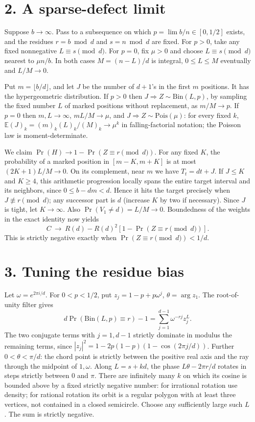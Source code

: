 \documentclass[11pt]{article}
\begin{document}
\section*{2. A sparse-defect limit}\label{a-sparse-defect-limit}

Suppose \(b\to\infty\). Pass to a subsequence on which
\(p=\lim b/n\in[0,1/2]\) exists, and the residues \(r=b\bmod d\) and
\(s=n\bmod d\) are fixed. For \(p>0\), take any fixed nonnegative
\(L\equiv s\pmod d\). For \(p=0\), fix \(\mu>0\) and choose
\(L\equiv s\pmod d\) nearest to \(\mu n/b\). In both cases \(M=(n-L)/d\)
is integral, \(0\le L\le M\) eventually and \(L/M\to0\).

Put \(m=\lfloor b/d\rfloor\), and let \(J\) be the number of \(d+1\)'s
in the first \(m\) positions. It has the hypergeometric distribution. If
\(p>0\) then \(J\Rightarrow Z\sim\mathrm{Bin}(L,p)\), by sampling the
fixed number \(L\) of marked positions without replacement, as
\(m/M\to p\). If \(p=0\) then \(m,L\to\infty\), \(mL/M\to\mu\), and
\(J\Rightarrow Z\sim\mathrm{Pois}(\mu)\): for every fixed \(k\),
\(\mathbb E(J)_k=(m)_k(L)_k/(M)_k\to\mu^k\) in falling-factorial
notation; the Poisson law is moment-determinate.

We claim \(\Pr(H)\to1-\Pr(Z\equiv r\pmod d)\). For any fixed \(K\), the
probability of a marked position in \([m-K,m+K]\) is at most
\((2K+1)L/M\to0\). On its complement, near \(m\) we have \(T_t=dt+J\).
If \(J\le K\) and \(K\ge4\), this arithmetic progression locally spans
the entire target interval and its neighbors, since \(0\le b-dm<d\).
Hence it hits the target precisely when \(J\not\equiv r\pmod d\); any
successor part is \(d\) (increase \(K\) by two if necessary). Since
\(J\) is tight, let \(K\to\infty\). Also \(\Pr(V_1\ne d)=L/M\to0\).
Boundedness of the weights in the exact identity now yields \[
 C\ \longrightarrow\ R(d)-R(d)^2[1-\Pr(Z\equiv r\pmod d)].
\] This is strictly negative exactly when \(\Pr(Z\equiv r\pmod d)<1/d\).

\section*{3. Tuning the residue bias}\label{tuning-the-residue-bias}

Let \(\omega=e^{2\pi i/d}\). For \(0<p<1/2\), put \(z_j=1-p+p\omega^j\),
\(\theta=\arg z_1\). The root-of-unity filter gives \[
 d\Pr(\mathrm{Bin}(L,p)\equiv r)-1
 =\sum_{j=1}^{d-1}\omega^{-rj}z_j^L.
\] The two conjugate terms with \(j=1,d-1\) strictly dominate in modulus
the remaining terms, since \(|z_j|^2=1-2p(1-p)(1-\cos(2\pi j/d))\).
Further \(0<\theta<\pi/d\): the chord point is strictly between the
positive real axis and the ray through the midpoint of \(1,\omega\).
Along \(L=s+kd\), the phase \(L\theta-2\pi r/d\) rotates in steps
strictly between 0 and \(\pi\). There are infinitely many \(k\) on which
its cosine is bounded above by a fixed strictly negative number: for
irrational rotation use density; for rational rotation its orbit is a
regular polygon with at least three vertices, not contained in a closed
semicircle. Choose any sufficiently large such \(L\). The sum is
strictly negative.
\end{document}
